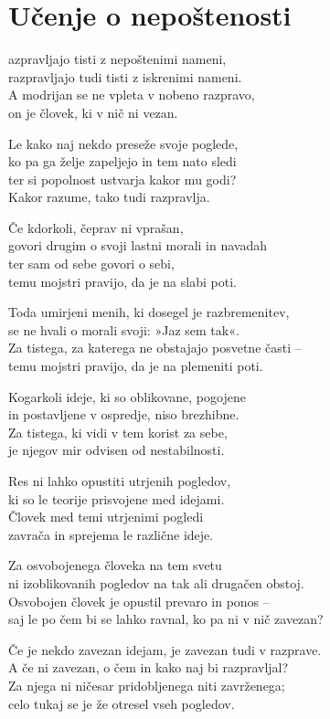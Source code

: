 \cleartorecto
{}
\chapter{Učenje o nepoštenosti}

azpravljajo tisti z nepoštenimi nameni,\\
razpravljajo tudi tisti z iskrenimi nameni.\\
A modrijan se ne vpleta v nobeno razpravo,\\
on je človek, ki v nič ni vezan.

Le kako naj nekdo preseže svoje poglede,\\
ko pa ga želje zapeljejo in tem nato sledi\\
ter si popolnost ustvarja kakor mu godi?\\
Kakor razume, tako tudi razpravlja.

\clearpage

Če kdorkoli, čeprav ni vprašan,\\
govori drugim o svoji lastni morali in navadah\\
ter sam od sebe govori o sebi,\\
temu mojstri pravijo, da je na slabi poti.

Toda umirjeni menih, ki dosegel je razbremenitev,\\
se ne hvali o morali svoji: »Jaz sem tak«.\\
Za tistega, za katerega ne obstajajo posvetne časti --\\
temu mojstri pravijo, da je na plemeniti poti.

Kogarkoli ideje, ki so oblikovane, pogojene\\
in postavljene v ospredje, niso brezhibne.\\
Za tistega, ki vidi v tem korist za sebe,\\
je njegov mir odvisen od nestabilnosti.

Res ni lahko opustiti utrjenih pogledov,\\
ki so le teorije prisvojene med idejami.\\
Človek med temi utrjenimi pogledi\\
zavrača in sprejema le različne ideje.

Za osvobojenega človeka na tem svetu\\
ni izoblikovanih pogledov na tak ali drugačen obstoj.\\
Osvobojen človek je opustil prevaro in ponos --\\
saj le po čem bi se lahko ravnal, ko pa ni v nič zavezan?

Če je nekdo zavezan idejam, je zavezan tudi v razprave.\\
A če ni zavezan, o čem in kako naj bi razpravljal?\\
Za njega ni ničesar pridobljenega niti zavrženega;\\
celo tukaj se je že otresel vseh pogledov.

